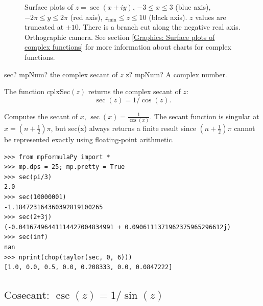 \begin{figure}[ht]%
	\centering
	\qquad
	\caption[Complex Secant]{Surface plots of $z = \sec(x + iy)$, $-3 \leq x \leq 3$ (blue axis), $-2 \pi \leq y \leq 2\pi$ (red axis), $z_{\text{min}} \leq z \leq 10$ (black axis). $z$ values are truncated at $\pm 10$. There is a branch cut along the negative real axis. Orthographic camera. See section \ref{Graphics: Surface plots of complex functions} for more information about charts for complex functions.} 
	\label{fig:Complex Secant}%
\end{figure}

\begin{mpFunctionsExtract}
	\mpFunctionOne
	{sec? mpNum? the complex secant of $z$}
	{z? mpNum? A complex number.}
\end{mpFunctionsExtract}

\vspace{0.3cm}
The function \textsf{cplxSec$(z)$} returns the complex secant of $z$: 
\begin{equation}
	\sec(z) = 1/\cos(z).
\end{equation}


Computes the secant of $x$, $\sec(x)=\frac{1}{\cos(x)}$. The secant function is singular at $x=(n+\tfrac{1}{2})\pi$, but sec(x) always returns a finite result since $(n+\tfrac{1}{2})\pi$ cannot be represented exactly using floating-point arithmetic.

\begin{lstlisting}
>>> from mpFormulaPy import *
>>> mp.dps = 25; mp.pretty = True
>>> sec(pi/3)
2.0
>>> sec(10000001)
-1.184723164360392819100265
>>> sec(2+3j)
(-0.04167496441114427004834991 + 0.0906111371962375965296612j)
>>> sec(inf)
nan
>>> nprint(chop(taylor(sec, 0, 6)))
[1.0, 0.0, 0.5, 0.0, 0.208333, 0.0, 0.0847222]
\end{lstlisting}




\newpage
\subsection{\texorpdfstring{$\text{Cosecant: }\csc(z) = 1/\sin(z)$}{csc}}

